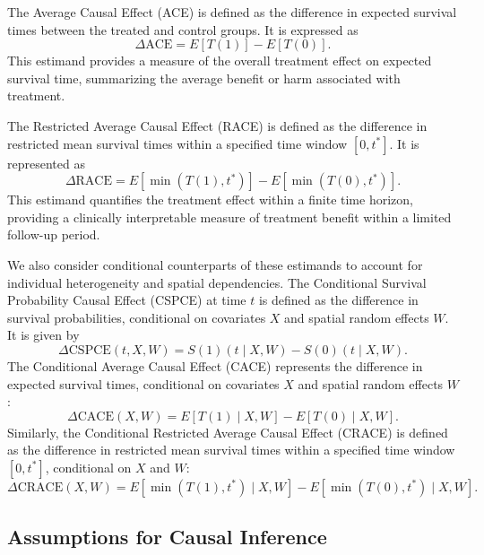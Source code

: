 \documentclass[useAMS,referee]{biom}
\begin{document}
The Average Causal Effect (ACE) is defined as the difference in expected survival times between the treated and control groups. It is expressed as 
\[
\Delta \text{ACE} = E[T(1)] - E[T(0)].
\]
This estimand provides a measure of the overall treatment effect on expected survival time, summarizing the average benefit or harm associated with treatment.

The Restricted Average Causal Effect (RACE) is defined as the difference in restricted mean survival times within a specified time window \( [0, t^*] \). It is represented as 
\[
\Delta \text{RACE} = E[\min(T(1), t^*)] - E[\min(T(0), t^*)].
\]
This estimand quantifies the treatment effect within a finite time horizon, providing a clinically interpretable measure of treatment benefit within a limited follow-up period.

We also consider conditional counterparts of these estimands to account for individual heterogeneity and spatial dependencies. The Conditional Survival Probability Causal Effect (CSPCE) at time \( t \) is defined as the difference in survival probabilities, conditional on covariates \( X \) and spatial random effects \( W \). It is given by 
\[
\Delta \text{CSPCE}(t, X, W) = S(1)(t \mid X, W) - S(0)(t \mid X, W).
\]
The Conditional Average Causal Effect (CACE) represents the difference in expected survival times, conditional on covariates \( X \) and spatial random effects \( W \):
\[
\Delta \text{CACE}(X, W) = E[T(1) \mid X, W] - E[T(0) \mid X, W].
\]
Similarly, the Conditional Restricted Average Causal Effect (CRACE) is defined as the difference in restricted mean survival times within a specified time window \( [0, t^*] \), conditional on \( X \) and \( W \):
\[
\Delta \text{CRACE}(X, W) = E[\min(T(1), t^*) \mid X, W] - E[\min(T(0), t^*) \mid X, W].
\]

\subsection{Assumptions for Causal Inference}
\end{document}
